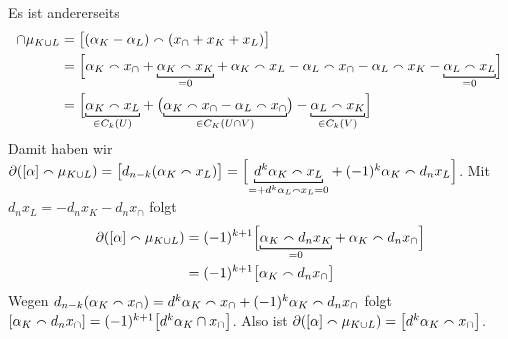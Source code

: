 \begin{beweis}
	Es ist andererseits 
	\begin{align}
		[\alpha] \cap \mu_{K \cup L} &= \benbrace[\big]{(\alpha_K -\alpha_L) \capp (x_\cap + x_K+x_L)} \\
		&= \benbrace[\Big]{\alpha_K \capp x_\cap  + \Underbracket{\alpha_K \capp x_K}{=0} + \alpha_K \capp x_L - \alpha_L \capp x_\cap - \alpha_L \capp x_K - \Underbracket{\alpha_L \capp x_L}{=0}} \\
		&= \benbrace[\Big]{\Underbracket{\alpha_K \capp x_L}{\in C_k(U)} + \enbrace[\big]{\Underbracket{\alpha_K \capp x_\cap - \alpha_L \capp x_\cap}{\in C_K(U \cap V)}} - \Underbracket{\alpha_L \capp x_K}{\in C_k(V)}} 
	\end{align}
	Damit haben wir 
	\(
		\partial \enbrace*{[\alpha] \capp \mu_{K \cup L}} = \benbrace[\big]{d_{n-k} \enbrace*{\alpha_K \capp x_L}} = \benbrace[\Big]{\Underbracket{d^k \alpha_K \capp x_L}{=+d^k \alpha_L \capp x_L=0} + (-1)^k \alpha_K \capp d_n x_L}
	\).
	Mit $d_n x_L = - d_n x_K - d_n x_\cap$ folgt 
	\begin{align}
		\partial \enbrace*{[\alpha]\capp \mu_{K \cup L}} &= (-1)^{k+1} \benbrace[\Big]{\Underbracket{\alpha_K \capp d_n x_K}{=0} + \alpha_K \capp d_n x_\cap} \\
		&= (-1)^{k+1} \benbrace[\big]{\alpha_K \capp d_n x_\cap}
	\end{align}
	Wegen $d_{n-k}(\alpha_K \smallfrown x_\cap)= d^k \alpha_K \smallfrown x_\cap + (-1)^k \alpha_K \smallfrown d_n x_\cap$ folgt $\benbrace*{\alpha_K \capp d_n x_\cap} = (-1)^{k+1} \benbrace*{d^k \alpha_K  \cap x_{\cap}}$.
	Also ist $\partial \enbrace*{[\alpha] \capp \mu_{K \cup L}} = \benbrace*{d^k  \alpha_K \capp x_\cap}$.
\end{beweis}

